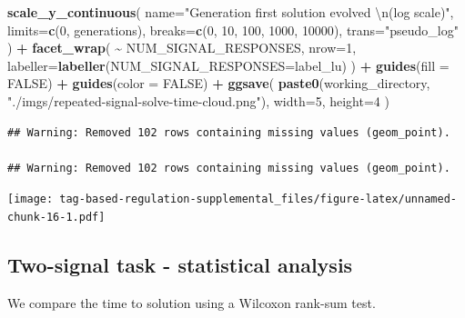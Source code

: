 \documentclass[
]{book}
\newenvironment{Shaded}{\begin{snugshade}}{\end{snugshade}}
\newcommand{\CharTok}[1]{\textcolor[rgb]{0.31,0.60,0.02}{#1}}
\newcommand{\DataTypeTok}[1]{\textcolor[rgb]{0.13,0.29,0.53}{#1}}
\newcommand{\DecValTok}[1]{\textcolor[rgb]{0.00,0.00,0.81}{#1}}
\newcommand{\KeywordTok}[1]{\textcolor[rgb]{0.13,0.29,0.53}{\textbf{#1}}}
\newcommand{\NormalTok}[1]{#1}
\newcommand{\OperatorTok}[1]{\textcolor[rgb]{0.81,0.36,0.00}{\textbf{#1}}}
\newcommand{\OtherTok}[1]{\textcolor[rgb]{0.56,0.35,0.01}{#1}}
\newcommand{\StringTok}[1]{\textcolor[rgb]{0.31,0.60,0.02}{#1}}
\begin{document}
\begin{Shaded}
\begin{Highlighting}[]
\StringTok{  }\KeywordTok{scale\_y\_continuous}\NormalTok{(}
    \DataTypeTok{name=}\StringTok{"Generation first solution evolved }\CharTok{\textbackslash{}n}\StringTok{(log scale)"}\NormalTok{,}
    \DataTypeTok{limits=}\KeywordTok{c}\NormalTok{(}\DecValTok{0}\NormalTok{, generations),}
    \DataTypeTok{breaks=}\KeywordTok{c}\NormalTok{(}\DecValTok{0}\NormalTok{, }\DecValTok{10}\NormalTok{, }\DecValTok{100}\NormalTok{, }\DecValTok{1000}\NormalTok{, }\DecValTok{10000}\NormalTok{),}
    \DataTypeTok{trans=}\StringTok{"pseudo\_log"}
\NormalTok{  ) }\OperatorTok{+}
\StringTok{  }\KeywordTok{facet\_wrap}\NormalTok{(}
    \OperatorTok{\textasciitilde{}}\StringTok{ }\NormalTok{NUM\_SIGNAL\_RESPONSES,}
    \DataTypeTok{nrow=}\DecValTok{1}\NormalTok{,}
    \DataTypeTok{labeller=}\KeywordTok{labeller}\NormalTok{(}\DataTypeTok{NUM\_SIGNAL\_RESPONSES=}\NormalTok{label\_lu)}
\NormalTok{  ) }\OperatorTok{+}
\StringTok{  }\KeywordTok{guides}\NormalTok{(}\DataTypeTok{fill =} \OtherTok{FALSE}\NormalTok{) }\OperatorTok{+}
\StringTok{  }\KeywordTok{guides}\NormalTok{(}\DataTypeTok{color =} \OtherTok{FALSE}\NormalTok{) }\OperatorTok{+}
\StringTok{  }\KeywordTok{ggsave}\NormalTok{(}
    \KeywordTok{paste0}\NormalTok{(working\_directory, }\StringTok{"./imgs/repeated{-}signal{-}solve{-}time{-}cloud.png"}\NormalTok{),}
    \DataTypeTok{width=}\DecValTok{5}\NormalTok{,}
    \DataTypeTok{height=}\DecValTok{4}
\NormalTok{  )}
\end{Highlighting}
\end{Shaded}

\begin{verbatim}
## Warning: Removed 102 rows containing missing values (geom_point).

## Warning: Removed 102 rows containing missing values (geom_point).
\end{verbatim}

\texttt{[image: tag-based-regulation-supplemental\_files/figure-latex/unnamed-chunk-16-1.pdf]}

\hypertarget{two-signal-task---statistical-analysis}{%
\subsection{Two-signal task - statistical analysis}\label{two-signal-task---statistical-analysis}}

We compare the time to solution using a Wilcoxon rank-sum test.
\end{document}
